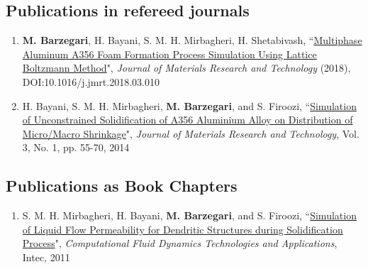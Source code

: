 \documentclass{cv}
\begin{document}
\subsection{Publications in refereed journals}
\begin{enumerate}
\item
\textbf{M. Barzegari}, H. Bayani, S. M. H. Mirbagheri, H. Shetabivash, ``\href{https://www.sciencedirect.com/science/article/pii/S2238785417303733}{Multiphase Aluminum A356 Foam Formation Process Simulation Using Lattice Boltzmann Method}", \textit{Journal of Materials Research and Technology} (2018), DOI:10.1016/j.jmrt.2018.03.010
\item
H. Bayani, S. M. H. Mirbagheri, \textbf{M. Barzegari}, and S. Firoozi, ``\href{http://www.sciencedirect.com/science/article/pii/S2238785413001129}{Simulation of Unconstrained Solidification of A356 Aluminium Alloy on Distribution of Micro/Macro Shrinkage}", \textit{Journal of Materials Research and Technology}, Vol. 3, No. 1, pp. 55-70, 2014
\end{enumerate}

\subsection{Publications as Book Chapters}

\begin{enumerate}
\item
S. M. H. Mirbagheri, H. Bayani, \textbf{M. Barzegari}, and S. Firoozi, ``\href{https://www.intechopen.com/books/computational-fluid-dynamics-technologies-and-applications/simulation-of-liquid-flow-permeability-for-dendritic-structures-during-solidification-process}{Simulation of Liquid Flow Permeability for Dendritic Structures during Solidification Process}", \textit{Computational Fluid Dynamics Technologies and Applications}, Intec, 2011
\end{enumerate}
\end{document}
